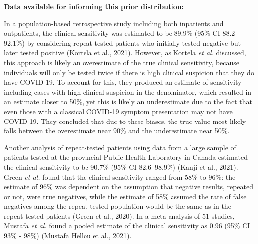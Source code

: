 \documentclass[12pt,twoside]{smiththesis}
\begin{document}
\textbf{Data available for informing this prior distribution:}

In a population-based retrospective study including both inpatients and outpatients, the clinical sensitivity was estimated to be 89.9\% (95\% CI 88.2 -- 92.1\%) by considering repeat-tested patients who initially tested negative but later tested positive (Kortela et al., 2021). However, as Kortela \emph{et al.} discussed, this approach is likely an overestimate of the true clinical sensitivity, because individuals will only be tested twice if there is high clinical suspicion that they do have COVID-19. To account for this, they produced an estimate of sensitivity including cases with high clinical suspicion in the denominator, which resulted in an estimate closer to 50\%, yet this is likely an underestimate due to the fact that even those with a classical COVID-19 symptom presentation may not have COVID-19. They concluded that due to these biases, the true value most likely falls between the overestimate near 90\% and the underestimate near 50\%.

Another analysis of repeat-tested patients using data from a large sample of patients tested at the provincial Public Health Laboratory in Canada estimated the clinical sensitivity to be 90.7\% (95\% CI 82.6--98.9\%) (Kanji et al., 2021). Green \emph{et al.} found that the clinical sensitivity ranged from 58\% to 96\%: the estimate of 96\% was dependent on the assumption that negative results, repeated or not, were true negatives, while the estimate of 58\% assumed the rate of false negatives among the repeat-tested population would be the same as in the repeat-tested patients (Green et al., 2020). In a meta-analysis of 51 studies, Mustafa \emph{et al.} found a pooled estimate of the clinical sensitivity as 0.96 (95\% CI 93\% - 98\%) (Mustafa Hellou et al., 2021).
\end{document}
